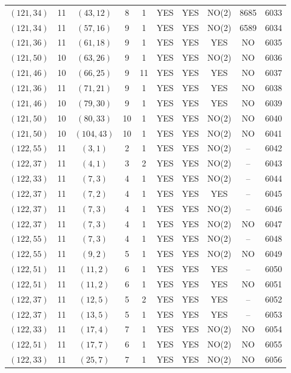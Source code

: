 \begin{longtable}{|c|c|c|c|c|c|c|c|c|c|}
$(121, 34)$ & 11 & $(43, 12)$ & 8 & 1 & YES & YES & NO(2) & 8685 & 6033\\
$(121, 34)$ & 11 & $(57, 16)$ & 9 & 1 & YES & YES & NO(2) & 6589 & 6034\\
$(121, 36)$ & 11 & $(61, 18)$ & 9 & 1 & YES & YES & YES & NO & 6035\\
$(121, 50)$ & 10 & $(63, 26)$ & 9 & 1 & YES & YES & NO(2) & NO & 6036\\
$(121, 46)$ & 10 & $(66, 25)$ & 9 & 11 & YES & YES & YES & NO & 6037\\
$(121, 36)$ & 11 & $(71, 21)$ & 9 & 1 & YES & YES & YES & NO & 6038\\
$(121, 46)$ & 10 & $(79, 30)$ & 9 & 1 & YES & YES & YES & NO & 6039\\
$(121, 50)$ & 10 & $(80, 33)$ & 10 & 1 & YES & YES & NO(2) & NO & 6040\\
$(121, 50)$ & 10 & $(104, 43)$ & 10 & 1 & YES & YES & NO(2) & NO & 6041\\
$(122, 55)$ & 11 & $(3, 1)$ & 2 & 1 & YES & YES & NO(2) & -- & 6042\\
$(122, 37)$ & 11 & $(4, 1)$ & 3 & 2 & YES & YES & NO(2) & -- & 6043\\
$(122, 33)$ & 11 & $(7, 3)$ & 4 & 1 & YES & YES & NO(2) & -- & 6044\\
$(122, 37)$ & 11 & $(7, 2)$ & 4 & 1 & YES & YES & YES & -- & 6045\\
$(122, 37)$ & 11 & $(7, 3)$ & 4 & 1 & YES & YES & NO(2) & -- & 6046\\
$(122, 37)$ & 11 & $(7, 3)$ & 4 & 1 & YES & YES & NO(2) & NO & 6047\\
$(122, 55)$ & 11 & $(7, 3)$ & 4 & 1 & YES & YES & NO(2) & -- & 6048\\
$(122, 55)$ & 11 & $(9, 2)$ & 5 & 1 & YES & YES & NO(2) & NO & 6049\\
$(122, 51)$ & 11 & $(11, 2)$ & 6 & 1 & YES & YES & YES & -- & 6050\\
$(122, 51)$ & 11 & $(11, 2)$ & 6 & 1 & YES & YES & YES & NO & 6051\\
$(122, 37)$ & 11 & $(12, 5)$ & 5 & 2 & YES & YES & YES & -- & 6052\\
$(122, 37)$ & 11 & $(13, 5)$ & 5 & 1 & YES & YES & YES & -- & 6053\\
$(122, 33)$ & 11 & $(17, 4)$ & 7 & 1 & YES & YES & NO(2) & NO & 6054\\
$(122, 51)$ & 11 & $(17, 7)$ & 6 & 1 & YES & YES & NO(2) & NO & 6055\\
$(122, 33)$ & 11 & $(25, 7)$ & 7 & 1 & YES & YES & NO(2) & NO & 6056\\

\end{longtable}
